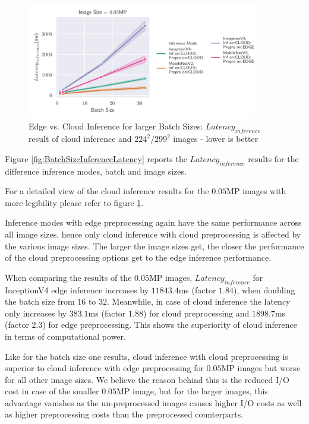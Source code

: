 \begin{figure}[H]
\centering
\includegraphics[width=0.9\textwidth]{./Bilder/single_plots/batch_size_plots/Effects_of_Batch_size_Inference_Latencies_only_CLOUD_NR.pdf}
\caption{Edge vs.  Cloud Inference for larger Batch Sizes: $Latency_{inference}$ result of cloud inference and $224^2/299^2$ images - lower is better}
\label{fig:BatchSizeLatenciesCloud}
\end{figure}

Figure \ref{fig:BatchSizeInferenceLatency} reports the $Latency_{inference}$ results for the difference inference modes, batch and image sizes.

For a detailed view of the cloud inference results for the $0.05$MP images with more legibility please refer to figure \ref{fig:BatchSizeLatenciesCloud}.

Inference modes with edge preprocessing again have the same performance across all image sizes, hence only cloud inference with cloud preprocessing is affected by the various image sizes.
The larger the image sizes get, the closer the performance of the cloud preprocessing options get to the edge inference performance.

When comparing the results of the $0.05$MP images, $Latency_{inference}$ for InceptionV4 edge inference  increases by $11843.4$ms (factor $1.84$), when doubling the batch size from $16$ to $32$.
Meanwhile, in case of cloud inference the latency only increases by $383.1$ms (factor $1.88$) for cloud preprocessing and $1898.7$ms (factor $2.3$) for edge preprocessing.
This shows the superiority of cloud inference in terms of computational power.

Like for the batch size one results, cloud inference with cloud preprocessing is superior to cloud inference with edge preprocessing for $0.05$MP images but worse for all other image sizes.
We believe the reason behind this is the reduced I/O cost in case of the smaller $0.05$MP image, but for the larger images, this advantage vanishes as the un-preprocessed images causes higher I/O costs as well as higher preprocessing costs than the preprocessed counterparts.

